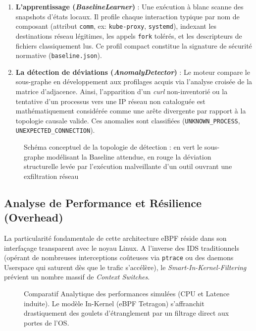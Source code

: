 \documentclass[a4paper,12pt]{article}
\begin{document}
\begin{enumerate}
    \item \textbf{L'apprentissage (\textit{BaselineLearner})} : Une exécution à blanc scanne des snapshots d'états locaux. Il profile chaque interaction typique par nom de composant (attribut \texttt{comm}, ex: \texttt{kube-proxy}, \texttt{systemd}), indexant les destinations réseau légitimes, les appels \texttt{fork} tolérés, et les descripteurs de fichiers classiquement lus. Ce profil compact constitue la signature de sécurité normative (\texttt{baseline.json}).
    \item \textbf{La détection de déviations (\textit{AnomalyDetector})} : Le moteur compare le sous-graphe en développement aux profilages acquis via l'analyse croisée de la matrice d'adjacence. Ainsi, l'apparition d'un \textit{curl} non-inventorié ou la tentative d'un processus vers une IP réseau non cataloguée est mathématiquement considérée comme une arête divergente par rapport à la topologie causale valide. Ces anomalies sont classifiées (\texttt{UNKNOWN\_PROCESS}, \texttt{UNEXPECTED\_CONNECTION}).
\end{enumerate}

\begin{figure}[htbp]
\centering
\fbox{\rule{0pt}{4in} \rule{0.9\linewidth}{0pt}}
\caption{Schéma conceptuel de la topologie de détection : en vert le sous-graphe modélisant la Baseline attendue, en rouge la déviation structurelle levée par l'exécution malveillante d'un outil ouvrant une exfiltration réseau}
\label{fig:threat_graph}
\end{figure}

\subsection{Analyse de Performance et Résilience (Overhead)}

La particularité fondamentale de cette architecture eBPF réside dans son interfaçage transparent avec le noyau Linux. A l'inverse des IDS traditionnels (opérant de nombreuses interceptions coûteuses via \texttt{ptrace} ou des daemons Userspace qui saturent dès que le trafic s'accélère), le \textit{Smart-In-Kernel-Filtering} prévient un nombre massif de \textit{Context Switches}.

\begin{figure}[htbp]
\centering
\fbox{\rule{0pt}{3.5in} \rule{0.9\linewidth}{0pt}}
\caption{Comparatif Analytique des performances simulées (CPU et Latence induite). Le modèle In-Kernel (eBPF Tetragon) s'affranchit drastiquement des goulets d'étranglement par un filtrage direct aux portes de l'OS.}
\label{fig:perf_chart}
\end{figure}
\end{document}
